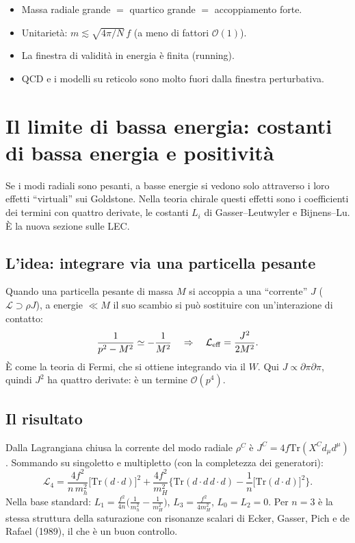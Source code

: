 \documentclass[11pt,a4paper]{article}
\numberwithin{equation}{section}
\theoremstyle{remark}
\newcommand{\Tr}{\mathrm{Tr}}
\begin{document}
\begin{porta}
\begin{itemize}[nosep]
\item Massa radiale grande $=$ quartico grande $=$ accoppiamento forte.
\item Unitarietà: $m\lesssim\sqrt{4\pi/N}\,f$ (a meno di fattori $\mathcal O(1)$).
\item La finestra di validità in energia è finita (running).
\item QCD e i modelli su reticolo sono molto fuori dalla finestra perturbativa.
\end{itemize}
\end{porta}

\section{Il limite di bassa energia: costanti di bassa energia e positività}
\label{cap:lec}

\begin{dove}
Se i modi radiali sono pesanti, a basse energie si vedono solo attraverso i loro effetti ``virtuali'' sui Goldstone. Nella teoria chirale questi effetti sono i coefficienti dei termini con quattro derivate, le costanti $L_i$ di Gasser--Leutwyler e Bijnens--Lu. È la nuova sezione sulle LEC.
\end{dove}

\subsection{L'idea: integrare via una particella pesante}

Quando una particella pesante di massa $M$ si accoppia a una ``corrente'' $J$ ($\mathcal L\supset\rho J$), a energie $\ll M$ il suo scambio si può sostituire con un'interazione di contatto:
\[
\frac{1}{p^2-M^2}\simeq-\frac{1}{M^2}\quad\Rightarrow\quad\mathcal L_{\rm eff}=\frac{J^2}{2M^2}.
\]
È come la teoria di Fermi, che si ottiene integrando via il $W$. Qui $J\propto\partial\pi\partial\pi$, quindi $J^2$ ha quattro derivate: è un termine $\mathcal O(p^4)$.

\subsection{Il risultato}

Dalla Lagrangiana chiusa la corrente del modo radiale $\rho^C$ è $J^C=4f\Tr(X^Cd_\mu d^\mu)$. Sommando su singoletto e multipletto (con la completezza dei generatori):
\[
\mathcal L_4=\frac{4f^2}{n\,m_h^2}\big[\Tr(d\cdot d)\big]^2+\frac{4f^2}{m_H^2}\Big\{\Tr(d\cdot d\,d\cdot d)-\frac1n\big[\Tr(d\cdot d)\big]^2\Big\}.
\]
Nella base standard: $L_1=\frac{f^2}{4n}\big(\frac1{m_h^2}-\frac1{m_H^2}\big)$, $L_3=\frac{f^2}{4m_H^2}$, $L_0=L_2=0$. Per $n=3$ è la stessa struttura della saturazione con risonanze scalari di Ecker, Gasser, Pich e de Rafael (1989), il che è un buon controllo.
\end{document}
